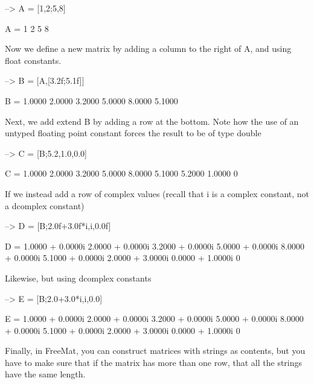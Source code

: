 \begin{DoxyVerbInclude}
--> A = [1,2;5,8]

A = 
 1 2 
 5 8 
\end{DoxyVerbInclude}


Now we define a new matrix by adding a column to the right of {\ttfamily A}, and using float constants.


\begin{DoxyVerbInclude}
--> B = [A,[3.2f;5.1f]]

B = 
    1.0000    2.0000    3.2000 
    5.0000    8.0000    5.1000 
\end{DoxyVerbInclude}


Next, we add extend {\ttfamily B} by adding a row at the bottom. Note how the use of an untyped floating point constant forces the result to be of type {\ttfamily double}


\begin{DoxyVerbInclude}
--> C = [B;5.2,1.0,0.0]

C = 
    1.0000    2.0000    3.2000 
    5.0000    8.0000    5.1000 
    5.2000    1.0000         0 
\end{DoxyVerbInclude}


If we instead add a row of {\ttfamily complex} values (recall that {\ttfamily i} is a {\ttfamily complex} constant, not a {\ttfamily dcomplex} constant)


\begin{DoxyVerbInclude}
--> D = [B;2.0f+3.0f*i,i,0.0f]

D = 
   1.0000 +  0.0000i   2.0000 +  0.0000i   3.2000 +  0.0000i 
   5.0000 +  0.0000i   8.0000 +  0.0000i   5.1000 +  0.0000i 
   2.0000 +  3.0000i   0.0000 +  1.0000i        0           
\end{DoxyVerbInclude}


Likewise, but using {\ttfamily dcomplex} constants


\begin{DoxyVerbInclude}
--> E = [B;2.0+3.0*i,i,0.0]

E = 
   1.0000 +  0.0000i   2.0000 +  0.0000i   3.2000 +  0.0000i 
   5.0000 +  0.0000i   8.0000 +  0.0000i   5.1000 +  0.0000i 
   2.0000 +  3.0000i   0.0000 +  1.0000i        0           
\end{DoxyVerbInclude}


Finally, in Free\-Mat, you can construct matrices with strings as contents, but you have to make sure that if the matrix has more than one row, that all the strings have the same length.


